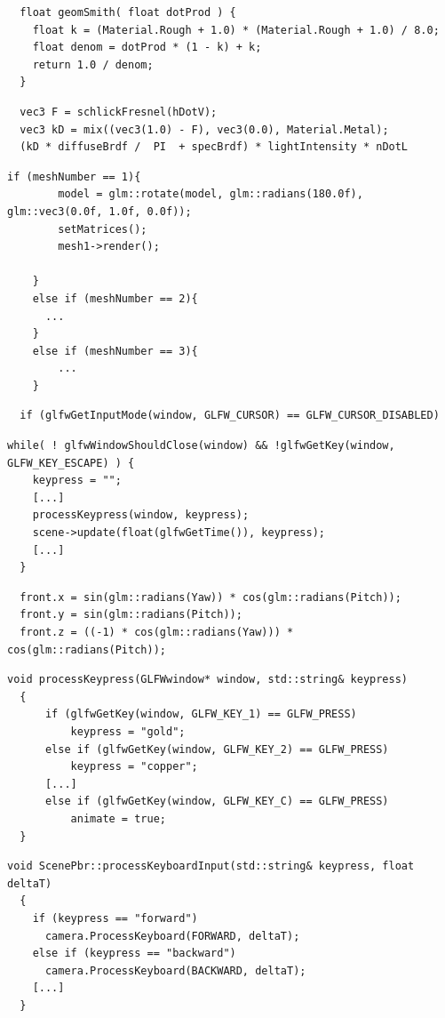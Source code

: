 \documentclass[
  11pt,
  a4paper,
  oneside
  ]{article}
\begin{document}
\begin{lstlisting}
  float geomSmith( float dotProd ) {
    float k = (Material.Rough + 1.0) * (Material.Rough + 1.0) / 8.0;
    float denom = dotProd * (1 - k) + k;
    return 1.0 / denom;
  }
\end{lstlisting}
\begin{lstlisting}
  vec3 F = schlickFresnel(hDotV);         
  vec3 kD = mix((vec3(1.0) - F), vec3(0.0), Material.Metal);
  (kD * diffuseBrdf /  PI  + specBrdf) * lightIntensity * nDotL
\end{lstlisting}
\begin{lstlisting}[tabsize=2]
  if (meshNumber == 1){
		model = glm::rotate(model, glm::radians(180.0f), glm::vec3(0.0f, 1.0f, 0.0f));
		setMatrices();
		mesh1->render();

	}
	else if (meshNumber == 2){
	  ...
	}
	else if (meshNumber == 3){
		...
	}
\end{lstlisting}
\begin{lstlisting}
  if (glfwGetInputMode(window, GLFW_CURSOR) == GLFW_CURSOR_DISABLED)
\end{lstlisting}
\begin{lstlisting}[tabsize=2]
  while( ! glfwWindowShouldClose(window) && !glfwGetKey(window, GLFW_KEY_ESCAPE) ) {
    keypress = "";
    [...]
    processKeypress(window, keypress);
    scene->update(float(glfwGetTime()), keypress);
    [...]
  }
\end{lstlisting}
\begin{lstlisting}
  front.x = sin(glm::radians(Yaw)) * cos(glm::radians(Pitch));
  front.y = sin(glm::radians(Pitch));
  front.z = ((-1) * cos(glm::radians(Yaw))) * cos(glm::radians(Pitch));
\end{lstlisting}
\begin{lstlisting}[tabsize=2]
  void processKeypress(GLFWwindow* window, std::string& keypress)
  {
      if (glfwGetKey(window, GLFW_KEY_1) == GLFW_PRESS)
          keypress = "gold";
      else if (glfwGetKey(window, GLFW_KEY_2) == GLFW_PRESS)
          keypress = "copper";
      [...]
      else if (glfwGetKey(window, GLFW_KEY_C) == GLFW_PRESS)
          animate = true;
  }
\end{lstlisting}
\begin{lstlisting}[tabsize=2]
  void ScenePbr::processKeyboardInput(std::string& keypress, float deltaT)
  {
    if (keypress == "forward")
      camera.ProcessKeyboard(FORWARD, deltaT);
    else if (keypress == "backward")
      camera.ProcessKeyboard(BACKWARD, deltaT);
    [...]
  }
\end{lstlisting}
\end{document}
